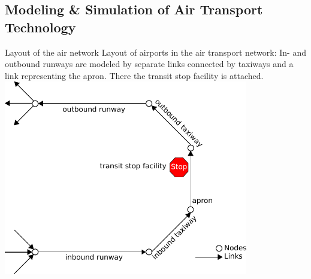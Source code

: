 \subsection{Modeling \& Simulation of Air Transport Technology}
\label{sec:modeling-of-technology}
%
%
%
\createfigure%
{Layout of the air network}%
{Layout of airports in the air transport network: In- and outbound runways are modeled by separate links connected by taxiways and a link representing the apron. There the transit stop facility is attached.}%
{\label{fig:air_airport}}%
{\includegraphics[width=0.8\textwidth]{extending/figures/air/sf_flight_model_airport.pdf}}%
